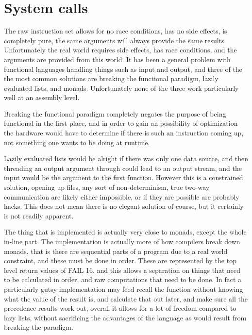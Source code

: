 \documentclass[12pt,letterpaper]{report}
\begin{document}
\section{System calls}
The raw instruction set allows for no race conditions, has no side effects, is completely pure, the same arguments will always provide the same results. Unfortunately the real world requires side effects, has race conditions, and the arguments are provided from this world. It has been a general problem with functional languages handling things such as input and output, and three of the the most common solutions are breaking the functional paradigm, lazily evaluated lists, and monads. Unfortunately none of the three work particularly well at an assembly level.

Breaking the functional paradigm completely negates the purpose of being functional in the first place, and in order to gain an possibility of optimization the hardware would have to determine if there is such an instruction coming up, not something one wants to be doing at runtime.

Lazily evaluated lists would be alright if there was only one data source, and then threading an output argument through could lead to an output stream, and the input would be the argument to the first function. However this is a constrained solution, opening up files, any sort of non-determinism, true two-way communication are likely either impossible, or if they are possible are probably hacks. This does not mean there is no elegant solution of course, but it certainly is not readily apparent.

The thing that is implemented is actually very close to monads, except the whole in-line part. The implementation is actually more of how compilers break down monads, that is there are sequential parts of a program due to a real world constraint, and these must be done in order. These are represented by the top level return values of FAIL 16, and this allows a separation on things that need to be calculated in order, and raw computations that need to be done. In fact a particularly gutsy implementation may feed recall the function without knowing what the value of the result is, and calculate that out later, and make sure all the precedence results work out, overall it allows for a lot of freedom compared to lazy lists, without sacrificing the advantages of the language as would result from breaking the paradigm.
\end{document}

